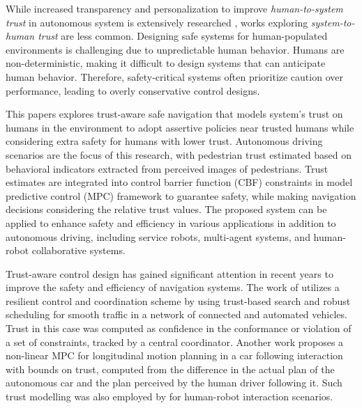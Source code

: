 \documentclass[journal]{IEEEtran}
\begin{document}
While increased transparency and personalization to improve \textit{human-to-system trust} in autonomous system is extensively researched \cite{sun2020exploring, akash2020human, akash2019improving}, works exploring \textit{system-to-human trust} are less common. Designing safe systems for human-populated environments is challenging due to unpredictable human behavior. Humans are non-deterministic, making it difficult to design systems that can anticipate human behavior. Therefore, safety-critical systems often prioritize caution over performance, leading to overly conservative control designs. 

This papers explores trust-aware safe navigation that models system's trust on humans in the environment to adopt assertive policies near trusted humans while considering extra safety for humans with lower trust. Autonomous driving scenarios are the focus of this research, with pedestrian trust estimated based on behavioral indicators extracted from perceived images of pedestrians. Trust estimates are integrated into control barrier function (CBF) \cite{ames2019control, ames2017cbfqp, amesadaptive} constraints  in model predictive control (MPC) framework to guarantee safety, while making navigation decisions considering the relative trust values. The proposed system can be applied to enhance safety and efficiency in various applications in addition to autonomous driving, including service robots, multi-agent systems, and human-robot collaborative systems.

Trust-aware control design has gained significant attention in recent years to improve the safety and efficiency of navigation systems. The work of \cite{sabbir2023trust} utilizes a resilient control and coordination scheme by using trust-based search and robust scheduling for smooth traffic in a network of connected and automated vehicles. Trust in this case was computed as confidence in the conformance or violation of a set of constraints, tracked by a central coordinator. Another work \cite{ozkan2022trustaware} proposes a non-linear MPC for longitudinal motion planning in a car following interaction with bounds on trust, computed from the difference in the actual plan of the autonomous car and the plan perceived by the human driver following it. Such trust modelling was also employed by \cite{zahedi2023trust} for human-robot interaction scenarios.
\end{document}
